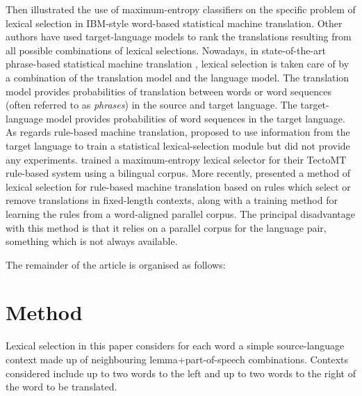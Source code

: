 \documentclass[11pt]{article}
\newcommand{\comment}[1]{\todo{#1}}
\begin{document}
Then \cite{berger1996} illustrated the use of maximum-entropy classifiers
on the specific problem of lexical selection in IBM-style word-based
statistical machine translation. Other authors
\citep{carbonell06,melero07a} have used target-language models to rank
the translations resulting from all possible combinations of lexical
selections.  Nowadays, in state-of-the-art phrase-based statistical
machine translation \citep{koehn2009statistical}, lexical selection is
taken care of by a combination of the translation model and the
language model. The translation model provides probabilities of
translation between words or word sequences (often referred to as
\emph{phrases}) in the source and target language. The target-language
model provides probabilities of word sequences in the target language.
As regards rule-based machine translation, \cite{sanchez07a} proposed 
to use information from the target language to train a statistical 
lexical-selection module but did not provide any experiments. 
\cite{marechek10} trained a maximum-entropy lexical selector for their TectoMT rule-based system
using a bilingual corpus.  More recently, \cite{tyers12a} presented a
method of lexical selection for rule-based machine translation based
on rules which select or remove translations in fixed-length contexts,
along with a training method for learning the rules from a
word-aligned parallel corpus. The principal disadvantage with this
method is that it relies on a parallel corpus for the language pair,
something which is not always available.

The remainder of the article is organised as follows: 

\section{Method}


\comment{Improve this} Lexical selection in this paper considers for
each word a simple source-language context made up of neighbouring
lemma+part-of-speech combinations. Contexts considered include up to
two words to the left and up to two words to the right of the word to
be translated. 
\end{document}
